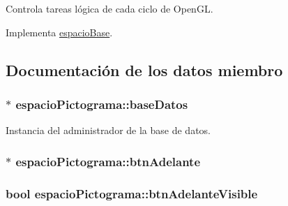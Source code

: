 Controla tareas lógica de cada ciclo de Open\+G\+L. 



Implementa \hyperlink{classespacio_base_a9b94b1106cd478dd78bc42078a36d013}{espacio\+Base}.



\subsection{Documentación de los datos miembro}
\hypertarget{classespacio_pictograma_a2e1fdcb75a25332576f897e77d1fe2de}{}
\subsubsection[{base\+Datos}]{$\ast$ espacio\+Pictograma\+::base\+Datos\hspace{0.3cm}{\ttfamily [private]}}\label{classespacio_pictograma_a2e1fdcb75a25332576f897e77d1fe2de}


Instancia del administrador de la base de datos. 

\hypertarget{classespacio_pictograma_a9157dd34f8f48cd755f721b288369dfe}{}
\subsubsection[{btn\+Adelante}]{$\ast$ espacio\+Pictograma\+::btn\+Adelante\hspace{0.3cm}{\ttfamily [private]}}\label{classespacio_pictograma_a9157dd34f8f48cd755f721b288369dfe}
\hypertarget{classespacio_pictograma_aecebb0c47c0d28f31052d5084e02aec2}{}
\subsubsection[{btn\+Adelante\+Visible}]{\setlength{\rightskip}{0pt plus 5cm}bool espacio\+Pictograma\+::btn\+Adelante\+Visible\hspace{0.3cm}{\ttfamily [private]}}\label{classespacio_pictograma_aecebb0c47c0d28f31052d5084e02aec2}


